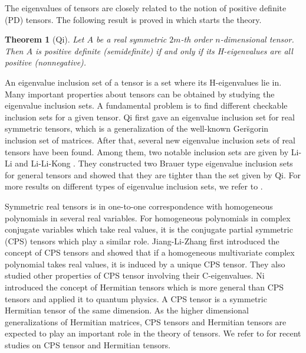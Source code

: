 \documentclass[10pt,reqno]{amsart}
\newtheorem{thm}{Theorem}[section]
\theoremstyle{definition}
\begin{document}
The eigenvalues of tensors are closely related to the notion of positive definite (PD) tensors. The following result is proved in \cite{Q1} which starts the theory.
\begin{thm} [Qi] \label{1.1}
Let $A$ be a real symmetric $2m$-th order $n$-dimensional tensor. Then $A$ is positive definite (semidefinite) if and only if its H-eigenvalues are all positive (nonnegative). 
\end{thm}
 An eigenvalue inclusion set of a tensor is a set where its H-eigenvalues lie in. Many important properties about tensors can be obtained by studying the eigenvalue inclusion sets. A fundamental problem is to find different checkable inclusion sets for a given tensor. Qi \cite{Q1} first gave an eigenvalue inclusion set for real symmetric tensors, which is a generalization of the well-known Ger\u{s}gorin inclusion set of matrices. After that, several new eigenvalue inclusion sets of real tensors
have been found. Among them, two notable inclusion sets are given by Li-Li \cite{LL} and Li-Li-Kong \cite{LLK}. They constructed two Brauer type
eigenvalue inclusion sets for general tensors and showed that they are tighter than the set given by Qi. For more results on different types of eigenvalue inclusion sets, we refer to \cite{BWS}\cite{LCL}\cite{LJL}\cite{LZL}\cite{WZC}.

Symmetric real tensors is in one-to-one correspondence with homogeneous polynomials in several real variables. For homogeneous polynomials in complex conjugate variables which take real values, it is the conjugate partial symmetric (CPS) tensors which play a similar role. Jiang-Li-Zhang \cite{JLZ} first introduced the concept of CPS tensors and showed that if a homogeneous multivariate complex polynomial takes real values, it is induced by a unique CPS tensor. They also studied other properties of CPS tensor involving their C-eigenvalues. Ni \cite{N} introduced the concept of Hermitian tensors which is more general than CPS tensors and applied it to quantum physics. A CPS tensor is a symmetric Hermitian tensor of the same dimension. As the higher dimensional generalizations of Hermitian matrices, CPS tensors and Hermitian tensors are expected to play an important role in the theory of tensors. We refer to \cite{FJL1}\cite{FJL2}\cite{NY} for recent studies on CPS tensor and Hermitian tensors. 
\end{document}
